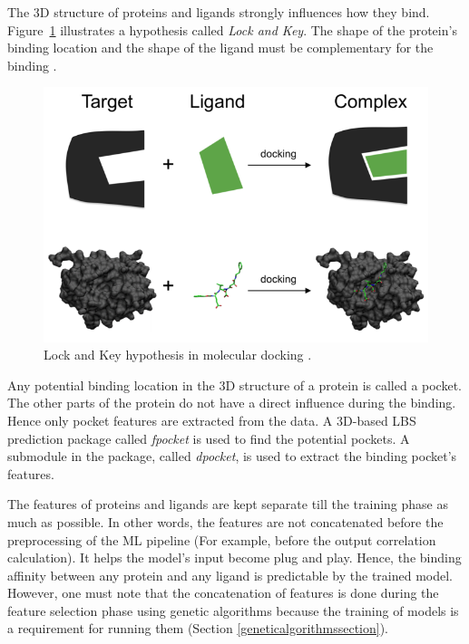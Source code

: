 \documentclass[11pt]{article}
\begin{document}
The 3D structure of proteins and ligands strongly influences how they bind.
Figure~\ref{fig:lockandkey} illustrates a hypothesis called \textit{Lock and Key}.
The shape of the protein's binding location and the shape of the ligand must be complementary for the binding \cite{proteinlingandbindingpaper}.

\begin{figure}[htb]
  \centering
    \includegraphics[scale=0.7]{images/lock_and_key}
    \caption{Lock and Key hypothesis in molecular docking \cite{lockandkeyformatpng}.}
    \label{fig:lockandkey}
\end{figure}

Any potential binding location in the 3D structure of a protein is called a pocket. The other parts of the protein do not have a direct influence during the binding. Hence only pocket features are extracted from the data.
A 3D-based LBS prediction package called \textit{fpocket} is used to find the potential pockets.
A submodule in the package, called \textit{dpocket}, is used to extract the binding pocket's features.

The features of proteins and ligands are kept separate till the training phase as much as possible.
In other words, the features are not concatenated before the preprocessing of the ML pipeline (For example, before the output correlation calculation).
It helps the model's input become plug and play.
Hence, the binding affinity between any protein and any ligand is predictable by the trained model.
However, one must note that the concatenation of features is done during the feature selection phase using genetic algorithms because the training of models is a requirement for running them (Section \ref{geneticalgorithmssection}).
\end{document}

